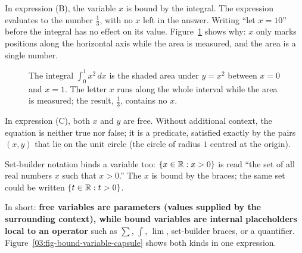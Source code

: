 In expression (B), the variable $x$ is bound by the integral. The expression evaluates to the number $\tfrac{1}{3}$, with no $x$ left in the answer. Writing ``let $x = 10$'' before the integral has no effect on its value. Figure~\ref{03:fig-integral-area} shows why: $x$ only marks positions along the horizontal axis while the area is measured, and the area is a single number.

\begin{figure}[htbp]
\centering
{}
\caption{The integral $\int_0^1 x^2 \, dx$ is the shaded area under $y = x^2$ between $x = 0$ and $x = 1$. The letter $x$ runs along the whole interval while the area is measured; the result, $\tfrac{1}{3}$, contains no $x$.}
\label{03:fig-integral-area}
\end{figure}

In expression (C), both $x$ and $y$ are free. Without additional context, the equation is neither true nor false; it is a predicate, satisfied exactly by the pairs $(x, y)$ that lie on the unit circle (the circle of radius $1$ centred at the origin).

Set-builder notation binds a variable too: $\{x \in \mathbb{R} : x > 0\}$ is read ``the set of all real numbers $x$ such that $x > 0$.'' The $x$ is bound by the braces; the same set could be written $\{t \in \mathbb{R} : t > 0\}$.

In short: \textbf{free variables are parameters (values supplied by the surrounding context), while bound variables are internal placeholders local to an operator} such as $\sum$, $\int$, $\lim$, set-builder braces, or a quantifier. Figure~\ref{03:fig-bound-variable-capsule} shows both kinds in one expression.

